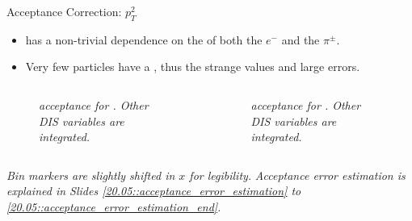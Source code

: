 \begin{frame}{Acceptance Correction: $p_T^2$}
    \label{11.55::pt2}

    \begin{itemize}
        \item
             has a non-trivial dependence on the \ef{$\theta$} of both the $e^-$ and the $\pi^\pm$.

        \vspace{6pt}
        \item
            Very few particles have a , thus the strange values and large errors.
    \end{itemize}

    \vspace{-12pt}
    \begin{columns}
        \begin{column}{.49\linewidth}
            \begin{center}
                \begin{figure}[t]
                    \scriptsize{\textit{
                         acceptance for \ef{$\pi^-$}.
                        Other DIS variables are integrated.
                    }}
                \end{figure}
            \end{center}
        \end{column}

        \begin{column}{.49\linewidth}
            \begin{center}
                \begin{figure}[t]
                    \scriptsize{\textit{
                         acceptance for \ef{$\pi^+$}.
                        Other DIS variables are integrated.
                    }}
                \end{figure}
            \end{center}
        \end{column}
    \end{columns}

    \begin{flushright}
        \tiny{\textit{Bin markers are slightly shifted in $x$ for legibility.}}
        \tiny{\textit{Acceptance error estimation is explained in Slides \textcolor{efd_purple}{\ref{20.05::acceptance_error_estimation}} to \textcolor{efd_purple}{\ref{20.05::acceptance_error_estimation_end}}.}}
    \end{flushright}
\end{frame}


